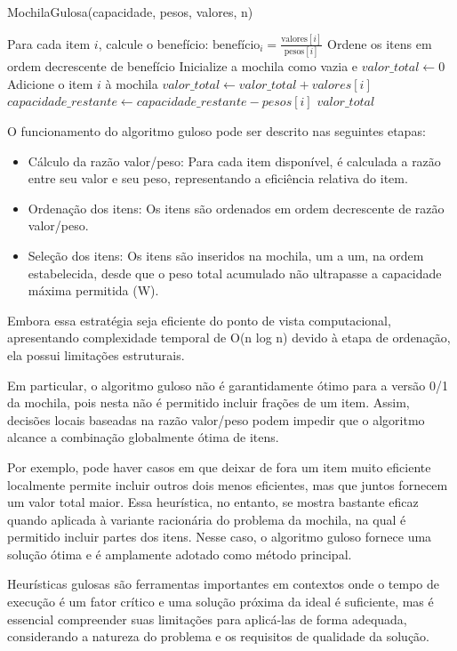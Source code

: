 \begin{algorithm}[H]
  \caption{MochilaGulosa(capacidade, pesos, valores, n)}
  \begin{algorithmic}[1]
  \State Para cada item $i$, calcule o benefício: $\text{benefício}_i = \frac{\text{valores}[i]}{\text{pesos}[i]}$
  \State Ordene os itens em ordem decrescente de benefício
  \State Inicialize a mochila como vazia e $valor\_total \gets 0$
          \State Adicione o item $i$ à mochila
          \State $valor\_total \gets valor\_total + valores[i]$
          \State $capacidade\_restante \gets capacidade\_restante - pesos[i]$
      \EndIf
  \EndFor
  \State \Return $valor\_total$
  \end{algorithmic}
\end{algorithm}

O funcionamento do algoritmo guloso pode ser descrito nas seguintes etapas:

\begin{itemize}
  \item Cálculo da razão valor/peso: Para cada item disponível, é calculada a razão entre seu valor e seu peso, representando a eficiência relativa do item.
  \item Ordenação dos itens: Os itens são ordenados em ordem decrescente de razão valor/peso.
  \item Seleção dos itens: Os itens são inseridos na mochila, um a um, na ordem estabelecida, desde que o peso total acumulado não ultrapasse a capacidade máxima permitida (W).
\end{itemize}

Embora essa estratégia seja eficiente do ponto de vista computacional, apresentando complexidade temporal de O(n log n) devido à etapa de ordenação,
ela possui limitações estruturais. 

Em particular, o algoritmo guloso não é garantidamente ótimo para a versão 0/1 da mochila, 
pois nesta não é permitido incluir frações de um item. Assim, decisões locais baseadas na razão valor/peso podem impedir que o algoritmo alcance
a combinação globalmente ótima de itens. 

Por exemplo, pode haver casos em que deixar de fora um item muito eficiente localmente permite 
incluir outros dois menos eficientes, mas que juntos fornecem um valor total maior. Essa heurística, no entanto, se mostra bastante eficaz quando 
aplicada à variante racionária do problema da mochila, na qual é permitido incluir partes dos itens. Nesse caso, o algoritmo guloso fornece 
uma solução ótima e é amplamente adotado como método principal.

Heurísticas gulosas são ferramentas importantes em contextos onde o tempo de execução 
é um fator crítico e uma solução próxima da ideal é suficiente, mas é essencial compreender suas limitações para aplicá-las de forma adequada, considerando a
natureza do problema e os requisitos de qualidade da solução.